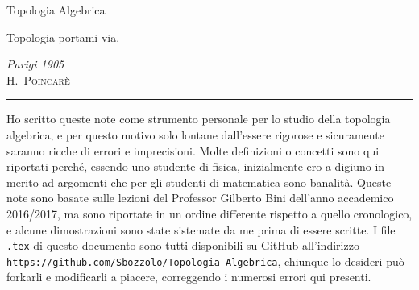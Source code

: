 \documentclass[10pt, twoside=false, x11names]{scrbook}
\begin{document}
\begin{titlepage}

  \noindent
  \titlefont Topologia Algebrica
  \epigraph{Topologia portami via.}%
  {\textit{Parigi 1905}\\ \textsc{H.\ Poincarè}}
  \null\vfill
  \vspace*{1cm}
  \noindent
  \hfill
  \begin{minipage}{0.35\linewidth}
    \begin{flushright}
      \printauthor
    \end{flushright}
  \end{minipage}
  \begin{minipage}{0.02\linewidth}
    \rule{1pt}{125pt}
  \end{minipage}
  \titlepagedecoration
\end{titlepage}


\vspace*{150pt}

Ho scritto queste note come strumento personale per lo studio
della topologia algebrica, e per questo motivo solo lontane dall'essere rigorose
e sicuramente saranno ricche di errori e imprecisioni. Molte definizioni o
concetti sono qui riportati perché, essendo uno studente di fisica, inizialmente
ero a digiuno in merito ad argomenti che per gli studenti di matematica sono
banalità. Queste note sono basate sulle lezioni del Professor Gilberto Bini
dell'anno accademico 2016/2017, ma sono riportate in un ordine differente
rispetto a quello cronologico, e alcune dimostrazioni sono state sistemate da me
prima di essere scritte. I file {\small \texttt{.tex} }di questo documento sono
tutti disponibili su GitHub all'indirizzo
\href{https://github.com/Sbozzolo/Topologia-Algebrica}{\small
  \texttt{https://github.com/Sbozzolo/Topologia-Algebrica}}, chiunque lo
desideri può forkarli e modificarli a piacere, correggendo i numerosi errori qui
presenti.
\\ \\
{
}

\tableofcontents
{}
\printsymblist






\printindex
\end{document}
